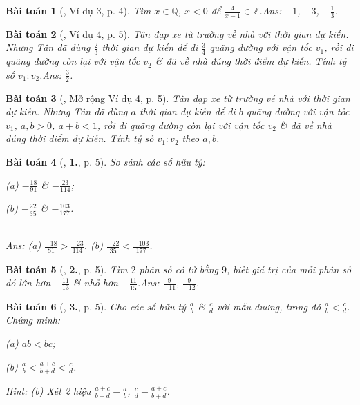 \documentclass{article}
\numberwithin{equation}{section}
\newtheorem{baitoan}{Bài toán}
\begin{document}
\begin{baitoan}[\cite{Binh_Toan_7_tap_1}, Ví dụ 3, p. 4]
	Tìm $x\in\mathbb{Q}$, $x < 0$ để $\frac{4}{x - 1}\in\mathbb{Z}$.\hfill\textsf{Ans:} $-1$, $-3$, $-\frac{1}{3}$.
\end{baitoan}

\begin{baitoan}[\cite{Binh_Toan_7_tap_1}, Ví dụ 4, p. 5]
	Tân đạp xe từ trường về nhà với thời gian dự kiến. Nhưng Tân đã dùng $\frac{2}{3}$ thời gian dự kiến để đi $\frac{3}{4}$ quãng đường với vận tốc $v_1$, rồi đi quãng đường còn lại với vận tốc $v_2$ \& đã về nhà đúng thời điểm dự kiến. Tính tỷ số $v_1:v_2$.\hfill\textsf{Ans:} $\frac{3}{2}$.
\end{baitoan}

\begin{baitoan}[\cite{Binh_Toan_7_tap_1}, Mở rộng Ví dụ 4, p. 5]
	Tân đạp xe từ trường về nhà với thời gian dự kiến. Nhưng Tân đã dùng $a$ thời gian dự kiến để đi $b$ quãng đường với vận tốc $v_1$, $a,b > 0$, $a + b < 1$, rồi đi quãng đường còn lại với vận tốc $v_2$ \& đã về nhà đúng thời điểm dự kiến. Tính tỷ số $v_1:v_2$ theo $a,b$.
\end{baitoan}

\begin{baitoan}[\cite{Binh_Toan_7_tap_1}, \textbf{1.}, p. 5]
	So sánh các số hữu tỷ:
	\begin{enumerate*}
		\item[(a)] $-\frac{18}{91}$ \& $-\frac{23}{114}$;
		\item[(b)] $-\frac{22}{35}$ \& $-\frac{103}{177}$.
	\end{enumerate*}\\\mbox{}\hfill\textsf{Ans:} (a) $\frac{-18}{81} > \frac{-23}{114}$. (b) $\frac{-22}{35} < \frac{-103}{177}$.
\end{baitoan}

\begin{baitoan}[\cite{Binh_Toan_7_tap_1}, \textbf{2.}, p. 5]
	Tìm $2$ phân số có tử bằng $9$, biết giá trị của mỗi phân số đó lớn hơn $-\frac{11}{13}$ \& nhỏ hơn $-\frac{11}{15}$.\hfill\textsf{Ans:} $\frac{9}{-11}$, $\frac{9}{-12}$.
\end{baitoan}

\begin{baitoan}[\cite{Binh_Toan_7_tap_1}, \textbf{3.}, p. 5]
	Cho các số hữu tỷ $\frac{a}{b}$ \& $\frac{c}{d}$ với mẫu dương, trong đó $\frac{a}{b} < \frac{c}{d}$. Chứng minh:
	\begin{enumerate*}
		\item[(a)] $ab < bc$;
		\item[(b)] $\frac{a}{b} < \frac{a + c}{b + d} < \frac{c}{d}$.
	\end{enumerate*}\hfill\textsf{Hint:} (b) Xét 2 hiệu $\frac{a + c}{b + d} - \frac{a}{b}$, $\frac{c}{d} - \frac{a + c}{b + d}$.
\end{baitoan}
\end{document}
